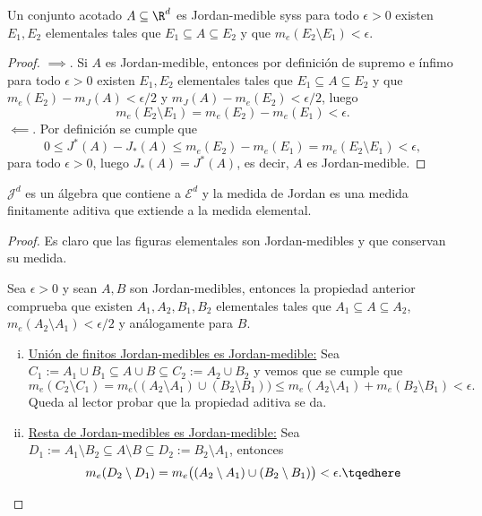 \begin{prop}
	Un conjunto acotado $A \subseteq \R^d$ es Jordan-medible syss para todo $\epsilon > 0$ existen $E_1, E_2$ elementales tales que $E_1 \subseteq A \subseteq E_2$ y que $m_e(E_2 \setminus E_1) < \epsilon$.
\end{prop}
\begin{proof}
	$\implies$. Si $A$ es Jordan-medible, entonces por definición de supremo e ínfimo para todo $\epsilon > 0$ existen $E_1,E_2$ elementales tales que $E_1 \subseteq A \subseteq E_2$ y que $m_e(E_2) - m_J(A) < \epsilon/2$ y $m_J(A) - m_e(E_2) < \epsilon/2$, luego 
	$$ m_e(E_2 \setminus E_1) = m_e(E_2) - m_e(E_1) < \epsilon. $$
	$\impliedby$. Por definición se cumple que
	$$ 0\le J^*(A) - J_*(A) \le m_e(E_2) - m_e(E_1) = m_e(E_2\setminus E_1) < \epsilon, $$
	para todo $\epsilon > 0$, luego $J_*(A) = J^*(A)$, es decir, $A$ es Jordan-medible.
\end{proof}

\begin{thm}
	$\mathcal{J}^d$ es un álgebra que contiene a $\mathcal{E}^d$ y la medida de Jordan es una medida finitamente aditiva que extiende a la medida elemental.
\end{thm}
\begin{proof}
	Es claro que las figuras elementales son Jordan-medibles y que conservan su medida.

	Sea $\epsilon > 0$ y sean $A,B$ son Jordan-medibles, entonces la propiedad anterior comprueba que existen $A_1,A_2,B_1,B_2$ elementales tales que $A_1\subseteq A\subseteq A_2$, $m_e(A_2\setminus A_1) < \epsilon/2$ y análogamente para $B$.

	\begin{enumerate}[i)]
		\item \underline{Unión de finitos Jordan-medibles es Jordan-medible:}
			Sea $C_1 := A_1\cup B_1 \subseteq A\cup B \subseteq C_2 := A_2\cup B_2$ y vemos que se cumple que
			$$ m_e(C_2 \setminus C_1) = m_e\big( (A_2\setminus A_1)\cup(B_2\setminus B_1) \big)
			\le m_e(A_2\setminus A_1) + m_e(B_2 \setminus B_1) < \epsilon. $$
			Queda al lector probar que la propiedad aditiva se da.

		\item \underline{Resta de Jordan-medibles es Jordan-medible:} 
			Sea $D_1 := A_1\setminus B_2 \subseteq A\setminus B \subseteq D_2 := B_2\setminus A_1$, entonces
			\begin{equation}
				m_e(D_2 \setminus D_1) = m_e\big( (A_2\setminus A_1)\cup(B_2\setminus B_1) \big) < \epsilon. \tqedhere
			\end{equation}
	\end{enumerate}
\end{proof}

